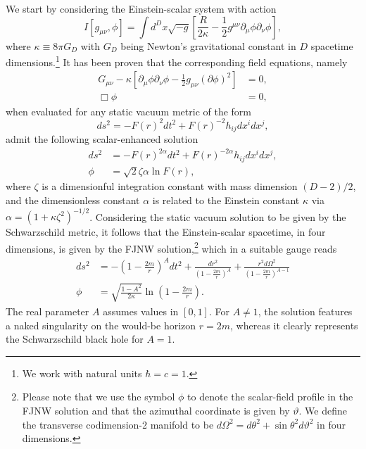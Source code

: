 \documentclass[aps,preprint,groupedaddress,nofootinbib,superscriptaddress,showkeys,showpacs,eqsecnum,amsmath,amssymb]{revtex4-1}
\begin{document}
We start by considering the Einstein-scalar system with action 
\begin{equation}
I[g_{\mu\nu},\phi]=\int d^{D}x\sqrt{-g}\left[  \frac{R}{2\kappa}-\frac{1}%
{2}g^{\mu\nu} \partial_\mu\phi\partial_\nu\phi\right] ,
\label{FJNWaction}%
\end{equation}
where $\kappa\equiv 8\pi G_{D}$ with $G_{D}$ being Newton's gravitational constant in $D$ spacetime dimensions.\footnote{We work with natural units $\hbar=c=1$.} It has been proven that the corresponding field equations, namely
\begin{subequations}
\begin{align}
G_{\mu\nu}-\kappa\left[\partial_\mu\phi\partial_\nu\phi-\frac{1}{2}g_{\mu\nu}(\partial\phi)^2\right]&=0,\\
\Box\phi&=0,
\end{align}
\end{subequations}
when evaluated for any static vacuum metric of the form 
\begin{equation}
ds^2=-F(r)^2dt^2+F(r)^{-2}h_{ij}dx^idx^j,
\end{equation}
admit the following scalar-enhanced solution 
\begin{subequations}
\begin{align}
ds^2&=-F(r)^{2\alpha}dt^2+F(r)^{-2\alpha}h_{ij}dx^idx^j,\\
\phi&=\sqrt{2}\zeta\alpha\ln F(r), 
\end{align}
\end{subequations}
where $\zeta$ is a dimensionful integration constant with mass dimension $(D-2)/2$, and the dimensionless constant $\alpha$ is related to the Einstein constant $\kappa$ via $\alpha=(1+\kappa\zeta^2)^{-1/2}$. Considering the static vacuum solution to be given by the Schwarzschild metric, it follows that the Einstein-scalar spacetime, in four dimensions, is given by the FJNW solution,\footnote{Please note that we use the symbol $\phi$ to denote the scalar-field profile in the FJNW solution and that the azimuthal coordinate is given by $\vartheta$. We define the transverse codimension-2 manifold to be $d\Omega^2=d\theta^2+\sin\theta^2 d\vartheta^2$ in four dimensions.} which in a suitable gauge reads 
\begin{subequations}\label{janis}
\begin{align} 
     ds^2&=-\left(1-\frac{2m}{r}\right)^A dt^2 + \frac{d r^2}{\left(1-\frac{2m}{r}\right)^A} + \frac{r^2d\Omega^2}{\left(1-\frac{2m}{r}\right)^{A-1} }  \\
    \phi &= \sqrt{\frac{1-A^2}{2 \kappa}} \ln \left(1-\frac{2m}{r}\right).
\end{align}
\end{subequations}
The real parameter $A$ assumes values in $[0,1]$. For $A\neq1$, the solution features a naked singularity on the would-be horizon $r=2m$, whereas it clearly represents the Schwarzschild black hole for $A=1$. 
\end{document}
